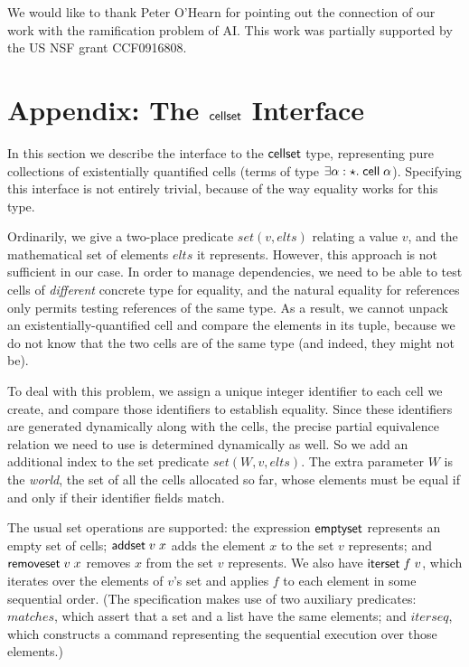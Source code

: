 \documentclass[preprint,natbib]{sigplanconf}
\begin{document}
\acks We would like to thank Peter O'Hearn for pointing out the connection
of our work with the ramification problem of AI. This work was
partially supported by the US NSF grant CCF0916808.

{}


% 
% 
% 
% 

\appendix

\section{Appendix: The $\mbox{\textsf{{cellset}}}$ Interface}

In this section we describe the interface to the $\mbox{\textsf{{cellset}}}$ type,
representing pure collections of existentially quantified cells
(terms of type $\exists \alpha:\star.\;
\mbox{\textsf{{cell}}}\;{\alpha}$). Specifying this interface is not entirely
trivial, because of the way equality works for this type. 

Ordinarily, we give a two-place predicate $set(v, elts)$ relating a
value $v$, and the mathematical set of elements $elts$ it represents.
However, this approach is not sufficient in our case. In order to
manage dependencies, we need to be able to test cells of
\emph{different} concrete type for equality, and the natural equality
for references only permits testing references of the same type. As a
result, we cannot unpack an existentially-quantified cell and compare
the elements in its tuple, because we do not know that the two cells
are of the same type (and indeed, they might not be). 

To deal with this problem, we assign a unique integer identifier to
each cell we create, and compare those identifiers to establish
equality. Since these identifiers are generated dynamically along with
the cells, the precise partial equivalence relation we need to use is
determined dynamically as well. So we add an additional index to the
set predicate $set(W, v, elts)$. The extra parameter $W$ is the
\emph{world}, the set of all the cells allocated so far, whose
elements must be equal if and only if their identifier fields match.

The usual set operations are supported: the expression
$\mbox{\textsf{{emptyset}}}$ represents an empty set of cells; 
$\mbox{\textsf{{addset}}}\;v\;x$ adds the element $x$ to the set $v$
represents; and $\mbox{\textsf{{removeset}}}\;v\;x$ removes $x$ from the
set $v$ represents. We also have $\mbox{\textsf{{iterset}}}\;f\;v$, which
iterates over the elements of $v$'s set and applies $f$ to each
element in some sequential order. (The specification
makes use of two auxiliary predicates: $\mathit{matches}$, which assert that a
set and a list have the same elements; and $\mathit{iterseq}$, which constructs
a command representing the sequential execution over those elements.)
\end{document}
